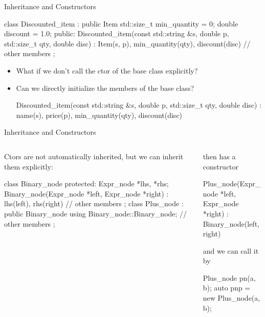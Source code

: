 \documentclass{beamer}
\begin{document}
\begin{frame}[fragile]{Inheritance and Constructors}
    \begin{cpp}
class Discounted_item : public Item {
  std::size_t min_quantity = 0;
  double discount = 1.0;
 public:
  Discounted_item(const std::string &s, double p,
                  std::size_t qty, double disc)
      : Item(s, p), min_quantity(qty), discount(disc) {}
  // other members
};
    \end{cpp}
    \begin{itemize}
        \item What if we don't call the ctor of the base class explicitly?
        \item Can we directly initialize the members of the base class?
        \begin{cpp}
Discounted_item(const std::string &s, double p,
                std::size_t qty, double disc)
    : name(s), price(p), min_quantity(qty),
      discount(disc) {}
        \end{cpp}
    \end{itemize}
\end{frame}

\begin{frame}[fragile]{Inheritance and Constructors}
    \begin{columns}
        \begin{column}{0.6\linewidth}
            Ctors are not automatically inherited, but we can inherit them explicitly:
            \begin{cpp}
class Binary_node {
 protected:
  Expr_node *lhs, *rhs;
  Binary_node(Expr_node *left,
      Expr_node *right)
      : lhs(left), rhs(right) {}
  // other members
};
class Plus_node
    : public Binary_node {
  using Binary_node::Binary_node;
  // other members
};
            \end{cpp}
        \end{column}
        \begin{column}{0.5\linewidth}
            then  has a constructor
            \begin{cpp}
Plus_node(Expr_node *left, Expr_node *right)
  : Binary_node(left, right) {}
            \end{cpp}
            and we can call it by
            \begin{cpp}
Plus_node pn(a, b);
auto pnp
    = new Plus_node(a, b);
            \end{cpp}
        \end{column}
    \end{columns}
\end{frame}
\end{document}
